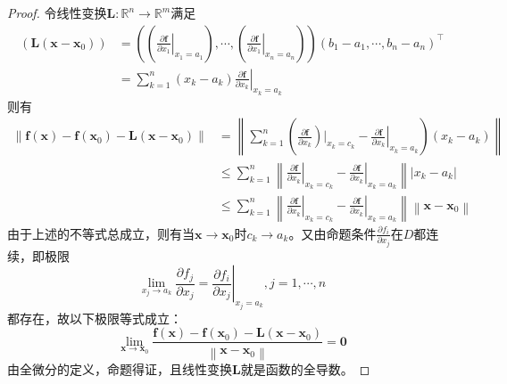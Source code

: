 \documentclass[main.tex]{subfiles}
\begin{document}
\begin{proof}
    令线性变换$\mathbf{L}:\mathbb{R}^n\rightarrow \mathbb{R}^m$满足
    \begin{align*}
        \left(\mathbf{L}\left(\mathbf{x}-\mathbf{x}_0\right)\right) & =\left(\left(\left.\frac{\partial \mathbf{f}}{\partial x_1}\right|_{x_1=a_1}\right),\cdots,\left(\left.\frac{\partial \mathbf{f}}{\partial x_1}\right|_{x_n=a_n}\right)\right)\left(b_1-a_1,\cdots,b_n-a_n\right)^\intercal \\
                                                                    & =\sum_{k=1}^n\left(x_k-a_k\right)\left.\frac{\partial \mathbf{f}}{\partial x_k}\right|_{x_k=a_k}
    \end{align*}
    则有
    \begin{align*}
        \left\|\mathbf{f}\left(\mathbf{x}\right)-\mathbf{f}\left(\mathbf{x}_0\right)-\mathbf{L}\left(\mathbf{x}-\mathbf{x}_0\right)\right\| & =\left\|\sum_{k=1}^n\left(\left.\frac{\partial \mathbf{f}}{\partial x_k}\right)|_{x_k=c_k}-\left.\frac{\partial \mathbf{f}}{\partial x_k}\right|_{x_k=a_k}\right)\left(x_k-a_k\right)\right\|      \\
                                                                                                                                            & \leq\sum_{k=1}^n\left\|\left.\frac{\partial \mathbf{f}}{\partial x_k}\right|_{x_k=c_k}-\left.\frac{\partial\mathbf{f}}{\partial x_k}\right|_{x_k=a_k}\right\|\left|x_k-a_k\right|                  \\
                                                                                                                                            & \leq\sum_{k=1}^n\left\|\left.\frac{\partial\mathbf{f}}{\partial x_k}\right|_{x_k=c_k}-\left.\frac{\partial\mathbf{f}}{\partial x_k}\right|_{x_k=a_k}\right\|\left\|\mathbf{x}-\mathbf{x}_0\right\|
    \end{align*}
    由于上述的不等式总成立，则有当$\mathbf{x}\to\mathbf{x}_0$时$c_k\to a_k$。又由命题条件$\frac{\partial f_i}{\partial x_j}$在$D$都连续，即极限
    \[
        \lim_{x_j\to a_k}\frac{\partial f_j}{\partial x_j}=\left.\frac{\partial f_i}{\partial x_j}\right|_{x_j=a_k},j=1,\cdots,n
    \]
    都存在，故以下极限等式成立：
    \[\lim_{\mathbf{x}\to\mathbf{x}_0}\frac{\mathbf{f}\left(\mathbf{x}\right)-\mathbf{f}\left(\mathbf{x}_0\right)-\mathbf{L}\left(\mathbf{x}-\mathbf{x}_0\right)}{\left\|\mathbf{x}-\mathbf{x}_0\right\|}=\mathbf{0}
    \]
    由全微分的定义，命题得证，且线性变换$\mathbf{L}$就是函数的全导数。
\end{proof}
\end{document}
